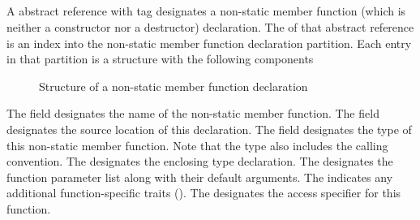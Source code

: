 \subsection{} 
\label{sec:ifc:DeclSort:Method}

A  abstract reference with tag  designates a non-static member function (which is neither a constructor nor a destructor) declaration.
The  of that abstract reference is an index into the non-static member function declaration partition.
Each entry in that partition is a structure with the following components
%
\begin{figure}[H]
	\centering
	\caption{Structure of a non-static member function declaration}
	\label{fig:ifc-method-decl-structure}
\end{figure}
%
The  field designates the name of the non-static member function.
The  field designates the source location of this declaration.
The  field designates the type of this non-static member function.  Note that the type also includes the calling convention.
The  designates the enclosing type declaration.
The  designates the function parameter list along with their default arguments.
The  indicates any additional function-specific traits ().
The  designates the access specifier for this function.



\subsection{} 
\label{sec:ifc:DeclSort:Constructor}

